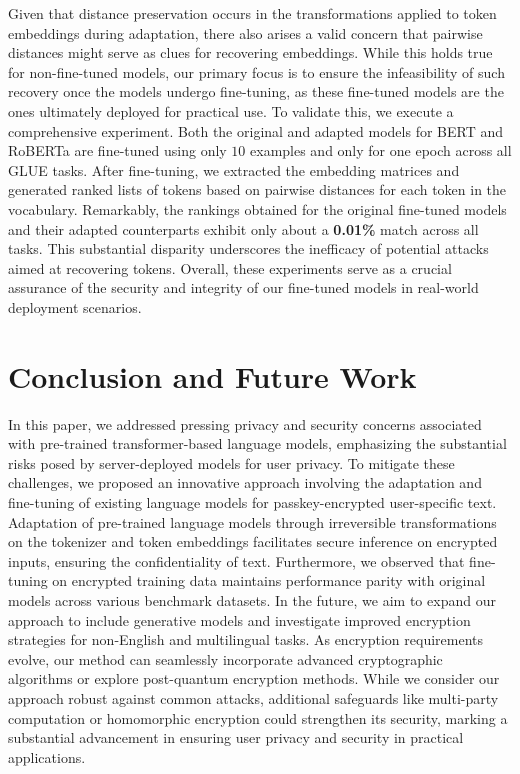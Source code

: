\documentclass[letterpaper]{article} %
\begin{document}
Given that distance preservation occurs in the transformations applied to token embeddings during adaptation, there also arises a valid concern that pairwise distances might serve as clues for recovering embeddings. While this holds true for non-fine-tuned models, our primary focus is to ensure the infeasibility of such recovery once the models undergo fine-tuning, as these fine-tuned models are the ones ultimately deployed for practical use. To validate this, we execute a comprehensive experiment. Both the original and adapted models for BERT and RoBERTa are fine-tuned using only $10$ examples and only for one epoch across all GLUE tasks. After fine-tuning, we extracted the embedding matrices and generated ranked lists of tokens based on pairwise distances for each token in the vocabulary. Remarkably, the rankings obtained for the original fine-tuned models and their adapted counterparts exhibit only about a \textbf{0.01\%} match across all tasks. This substantial disparity underscores the inefficacy of potential attacks aimed at recovering tokens. Overall, these experiments serve as a crucial assurance of the security and integrity of our fine-tuned models in real-world deployment scenarios.
\section{Conclusion and Future Work}
\label{label:conclusion}
In this paper, we addressed pressing privacy and security concerns associated with pre-trained transformer-based language models, emphasizing the substantial risks posed by server-deployed models for user privacy. To mitigate these challenges, we proposed an innovative approach involving the adaptation and fine-tuning of existing language models for passkey-encrypted user-specific text. Adaptation of pre-trained language models through irreversible transformations on the tokenizer and token embeddings facilitates secure inference on encrypted inputs, ensuring the confidentiality of text. Furthermore, we observed that fine-tuning on encrypted training data maintains performance parity with original models across various benchmark datasets. In the future, we aim to expand our approach to include generative models and investigate improved encryption strategies for non-English and multilingual tasks. As encryption requirements evolve, our method can seamlessly incorporate advanced cryptographic algorithms or explore post-quantum encryption methods. While we consider our approach robust against common attacks, additional safeguards like multi-party computation or homomorphic encryption could strengthen its security, marking a substantial advancement in ensuring user privacy and security in practical applications.
\end{document}
